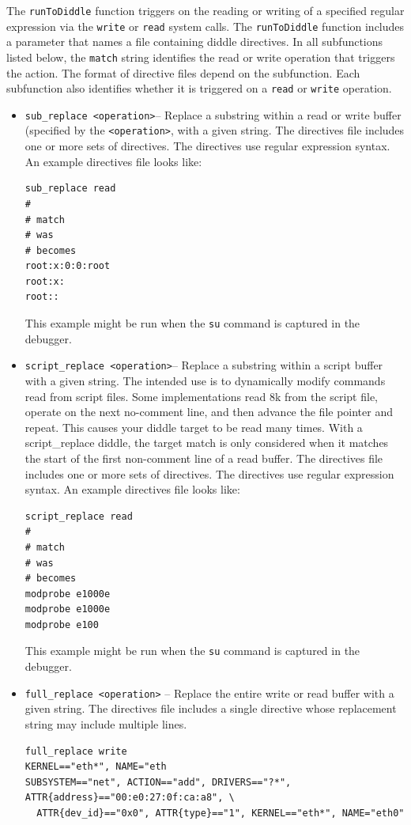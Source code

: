 \documentclass[titlepage]{article}
\begin{document}
The {\tt runToDiddle} function triggers on the reading or writing of a specified
regular expression via the {\tt write} or {\tt read} system calls.  
The {\tt runToDiddle} function includes a parameter that names a file containing
diddle directives.  In all subfunctions listed
below, the {\tt match} string identifies the read or write operation that triggers the action. 
The format of directive files depend on the subfunction.  Each subfunction also identifies whether it is
triggered on a {\tt read} or {\tt write} operation. 
 
\begin{itemize}
\item {\tt sub\_replace <operation>}-- Replace a substring within a read or write buffer (specified by the
{\tt <operation>}, with a given string.
The directives file includes one or more sets of directives.
The directives use regular expression syntax.
An example directives file looks like:
\begin{verbatim}
sub_replace read
#
# match
# was
# becomes
root:x:0:0:root
root:x:
root::
\end{verbatim}
\noindent This example might be run when the {\tt su} command is captured in the debugger.

\item {\tt script\_replace <operation>}-- Replace a substring within a script buffer with a given string.
The intended use is to dynamically modify commands read from script files. Some implementations read 8k
from the script file, operate on the next no-comment line, and then advance the file pointer and repeat.  This causes your diddle target to be read
many times.  With a script\_replace diddle, the target match is only considered when it matches the start
of the first non-comment line of a read buffer. 
The directives file includes one or more sets of directives.
The directives use regular expression syntax.
An example directives file looks like:
\begin{verbatim}
script_replace read
#
# match
# was
# becomes
modprobe e1000e
modprobe e1000e
modprobe e100
\end{verbatim}
\noindent This example might be run when the {\tt su} command is captured in the debugger.

\item {\tt full\_replace <operation>} -- Replace the entire write or read buffer with a given string.
The directives file includes a single directive whose replacement string may include multiple lines.
\begin{verbatim}
full_replace write
KERNEL=="eth*", NAME="eth
SUBSYSTEM=="net", ACTION=="add", DRIVERS=="?*", ATTR{address}=="00:e0:27:0f:ca:a8", \
  ATTR{dev_id}=="0x0", ATTR{type}=="1", KERNEL=="eth*", NAME="eth0"


\end{verbatim}
\end{itemize}
\end{document}
